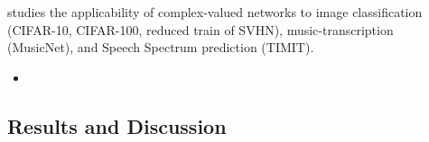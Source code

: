 \documentclass[a4paper,10pt]{article}
\begin{document}
\cite{trabelsi_deep_2017} studies the applicability of complex-valued networks to
image classification (CIFAR-10, CIFAR-100, reduced train of SVHN), music-transcription
(MusicNet), and Speech Spectrum prediction (TIMIT).
\begin{itemize}
  \item 
\end{itemize}


\cite{monning_evaluation_2018}
\cite{jankowski_complex-valued_1996}
\cite{amin_complex-valued_nodate}
\cite{sarroff_complex_nodate}
\cite{lapidoth_capacity_2003}


\subsection{Results and Discussion} %
\label{sub:results_and_discussion}



\clearpage



\nocite{*}
\end{document}
